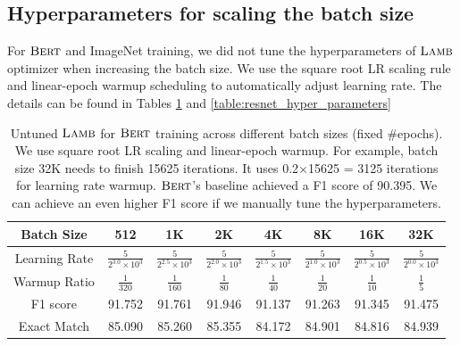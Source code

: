 \subsection{Hyperparameters for scaling the batch size}
For $\textsc{Bert}$ and ImageNet training, we did not tune the hyperparameters of $\textsc{Lamb}$ optimizer when increasing the batch size. We use the square root LR scaling rule and linear-epoch warmup scheduling to automatically adjust learning rate. The details can be found in Tables \ref{table:hyper_parameters} and \ref{table:resnet_hyper_parameters}

\begin{table}[ht]
\renewcommand{\arraystretch}{1.3}
\caption{Untuned $\textsc{Lamb}$ for $\textsc{Bert}$ training across different batch sizes (fixed \#epochs). We use square root LR scaling and linear-epoch warmup. For example, batch size 32K needs to finish 15625 iterations. It uses 0.2$\times$15625 = 3125 iterations for learning rate warmup. $\textsc{Bert}$'s baseline achieved a F1 score of 90.395. We can achieve an even higher F1 score if we manually tune the hyperparameters.}

\centering
\begin{tabular}{|c|c|c|c|c|c|c|c|}
\hline
Batch Size & 512 & 1K & 2K & 4K & 8K & 16K & 32K\\
\hline
\hline
Learning Rate & $\frac{5}{2^{3.0}\times10^{3}}$ & $\frac{5}{2^{2.5}\times10^{3}}$ & $\frac{5}{2^{2.0}\times10^{3}}$ & $\frac{5}{2^{1.5}\times10^{3}}$ & $\frac{5}{2^{1.0}\times10^{3}}$ & $\frac{5}{2^{0.5}\times10^{3}}$ & $\frac{5}{2^{0.0}\times10^{3}}$\\
\hline
Warmup Ratio & $\frac{1}{320}$ & $\frac{1}{160}$ & $\frac{1}{80}$ & $\frac{1}{40}$ & $\frac{1}{20}$ & $\frac{1}{10}$ & $\frac{1}{5}$\\
\hline
F1 score & 91.752 & 91.761 & 91.946 & 91.137 & 91.263 & 91.345 & 91.475 \\
\hline
Exact Match & 85.090 & 85.260 & 85.355 & 84.172 & 84.901 & 84.816 & 84.939 \\
\hline
\end{tabular}
\label{table:hyper_parameters}
\end{table}

